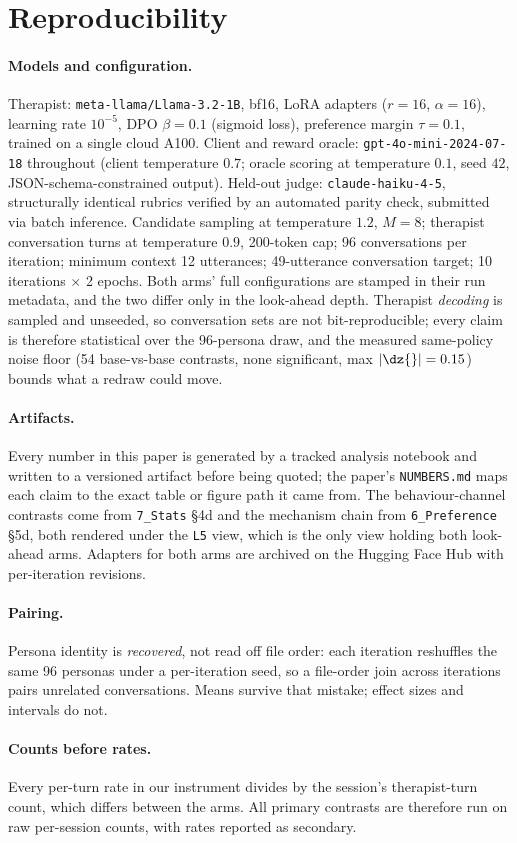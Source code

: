 \section{Reproducibility}
\label{app:repro}

\paragraph{Models and configuration.} Therapist: \texttt{meta-llama/Llama-3.2-1B}, bf16, LoRA
adapters ($r=16$, $\alpha=16$), learning rate $10^{-5}$, DPO $\beta=0.1$ (sigmoid loss),
preference margin $\tau=0.1$, trained on a single cloud A100. Client and reward oracle:
\texttt{gpt-4o-mini-2024-07-18} throughout (client temperature $0.7$; oracle scoring at
temperature $0.1$, seed $42$, JSON-schema-constrained output). Held-out judge:
\texttt{claude-haiku-4-5}, structurally identical rubrics verified by an automated parity check,
submitted via batch inference. Candidate sampling at temperature $1.2$, $M=8$; therapist
conversation turns at temperature $0.9$, 200-token cap; 96 conversations per iteration; minimum
context 12 utterances; 49-utterance conversation target; 10 iterations $\times$ 2 epochs. Both
arms' full configurations are stamped in their run metadata, and the two differ only in the
look-ahead depth. Therapist \emph{decoding} is sampled and unseeded, so conversation sets are
not bit-reproducible; every claim is therefore statistical over the 96-persona draw, and the
measured same-policy noise floor (54 base-vs-base contrasts, none significant, max
$|\dz{}|=0.15$) bounds what a redraw could move.

\paragraph{Artifacts.} Every number in this paper is generated by a tracked analysis notebook and
written to a versioned artifact before being quoted; the paper's \texttt{NUMBERS.md} maps each
claim to the exact table or figure path it came from. The behaviour-channel contrasts come from
\texttt{7\_Stats} \S4d and the mechanism chain from \texttt{6\_Preference} \S5d, both rendered
under the \texttt{L5} view, which is the only view holding both look-ahead arms. Adapters for
both arms are archived on the Hugging Face Hub with per-iteration revisions.

\paragraph{Pairing.} Persona identity is \emph{recovered}, not read off file order: each iteration
reshuffles the same 96 personas under a per-iteration seed, so a file-order join across iterations
pairs unrelated conversations. Means survive that mistake; effect sizes and intervals do not.

\paragraph{Counts before rates.} Every per-turn rate in our instrument divides by the session's
therapist-turn count, which differs between the arms. All primary contrasts are therefore run on
raw per-session counts, with rates reported as secondary.
